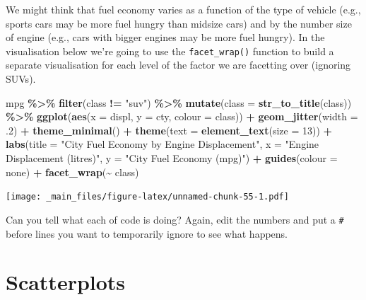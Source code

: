 \documentclass[
]{book}
\newenvironment{Shaded}{\begin{snugshade}}{\end{snugshade}}
\newcommand{\AttributeTok}[1]{\textcolor[rgb]{0.13,0.29,0.53}{#1}}
\newcommand{\DecValTok}[1]{\textcolor[rgb]{0.00,0.00,0.81}{#1}}
\newcommand{\FunctionTok}[1]{\textcolor[rgb]{0.13,0.29,0.53}{\textbf{#1}}}
\newcommand{\NormalTok}[1]{#1}
\newcommand{\SpecialCharTok}[1]{\textcolor[rgb]{0.81,0.36,0.00}{\textbf{#1}}}
\newcommand{\StringTok}[1]{\textcolor[rgb]{0.31,0.60,0.02}{#1}}
\begin{document}
We might think that fuel economy varies as a function of the type of vehicle (e.g., sports cars may be more fuel hungry than midsize cars) and by the number size of engine (e.g., cars with bigger engines may be more fuel hungry). In the visualisation below we're going to use the \texttt{facet\_wrap()} function to build a separate visualisation for each level of the factor we are facetting over (ignoring SUVs).

\begin{Shaded}
\begin{Highlighting}[]
\NormalTok{mpg }\SpecialCharTok{\%\textgreater{}\%}
  \FunctionTok{filter}\NormalTok{(class }\SpecialCharTok{!=} \StringTok{"suv"}\NormalTok{) }\SpecialCharTok{\%\textgreater{}\%}
  \FunctionTok{mutate}\NormalTok{(}\AttributeTok{class =} \FunctionTok{str\_to\_title}\NormalTok{(class)) }\SpecialCharTok{\%\textgreater{}\%}
  \FunctionTok{ggplot}\NormalTok{(}\FunctionTok{aes}\NormalTok{(}\AttributeTok{x =}\NormalTok{ displ, }\AttributeTok{y =}\NormalTok{ cty, }\AttributeTok{colour =}\NormalTok{ class)) }\SpecialCharTok{+} 
  \FunctionTok{geom\_jitter}\NormalTok{(}\AttributeTok{width =}\NormalTok{ .}\DecValTok{2}\NormalTok{) }\SpecialCharTok{+}
  \FunctionTok{theme\_minimal}\NormalTok{() }\SpecialCharTok{+}
  \FunctionTok{theme}\NormalTok{(}\AttributeTok{text =} \FunctionTok{element\_text}\NormalTok{(}\AttributeTok{size =} \DecValTok{13}\NormalTok{)) }\SpecialCharTok{+}
  \FunctionTok{labs}\NormalTok{(}\AttributeTok{title =} \StringTok{"City Fuel Economy by Engine Displacement"}\NormalTok{,}
       \AttributeTok{x =} \StringTok{"Engine Displacement (litres)"}\NormalTok{, }
       \AttributeTok{y =} \StringTok{"City Fuel Economy (mpg)"}\NormalTok{) }\SpecialCharTok{+}
  \FunctionTok{guides}\NormalTok{(}\AttributeTok{colour =} \StringTok{\textquotesingle{}none\textquotesingle{}}\NormalTok{) }\SpecialCharTok{+}
  \FunctionTok{facet\_wrap}\NormalTok{(}\SpecialCharTok{\textasciitilde{}}\NormalTok{ class)}
\end{Highlighting}
\end{Shaded}

\texttt{[image: \_main\_files/figure-latex/unnamed-chunk-55-1.pdf]}

Can you tell what each of code is doing? Again, edit the numbers and put a \texttt{\#} before lines you want to temporarily ignore to see what happens.

\hypertarget{scatterplots}{%
\section{Scatterplots}\label{scatterplots}}
\end{document}
